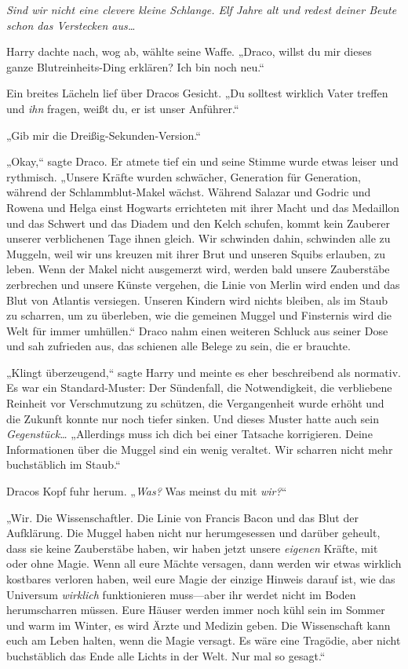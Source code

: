 {\emph{Sind wir nicht eine clevere kleine Schlange. Elf Jahre alt und redest deiner Beute schon das Verstecken aus…}

Harry dachte nach, wog ab, wählte seine Waffe. „Draco, willst du mir dieses ganze Blutreinheits-Ding erklären? Ich bin noch neu.“

Ein breites Lächeln lief über Dracos Gesicht. „Du solltest wirklich Vater treffen und \emph{ihn} fragen, weißt du, er ist unser Anführer.“

„Gib mir die Dreißig-Sekunden-Version.“

„Okay,“ sagte Draco. Er atmete tief ein und seine Stimme wurde etwas leiser und rythmisch. „Unsere Kräfte wurden schwächer, Generation für Generation, während der Schlammblut-Makel wächst. Während Salazar und Godric und Rowena und Helga einst Hogwarts errichteten mit ihrer Macht und das Medaillon und das Schwert und das Diadem und den Kelch schufen, kommt kein Zauberer unserer verblichenen Tage ihnen gleich. Wir schwinden dahin, schwinden alle zu Muggeln, weil wir uns kreuzen mit ihrer Brut und unseren Squibs erlauben, zu leben. Wenn der Makel nicht ausgemerzt wird, werden bald unsere Zauberstäbe zerbrechen und unsere Künste vergehen, die Linie von Merlin wird enden und das Blut von Atlantis versiegen. Unseren Kindern wird nichts bleiben, als im Staub zu scharren, um zu überleben, wie die gemeinen Muggel und Finsternis wird die Welt für immer umhüllen.“ Draco nahm einen weiteren Schluck aus seiner Dose und sah zufrieden aus, das schienen alle Belege zu sein, die er brauchte.

„Klingt überzeugend,“ sagte Harry und meinte es eher beschreibend als normativ. Es war ein Standard-Muster: Der Sündenfall, die Notwendigkeit, die verbliebene Reinheit vor Verschmutzung zu schützen, die Vergangenheit wurde erhöht und die Zukunft konnte nur noch tiefer sinken. Und dieses Muster hatte auch sein \emph{Gegenstück…} „Allerdings muss ich dich bei einer Tatsache korrigieren. Deine Informationen über die Muggel sind ein wenig veraltet. Wir scharren nicht mehr buchstäblich im Staub.“

Dracos Kopf fuhr herum. „\emph{Was?} Was meinst du mit \emph{wir?}“

„Wir. Die Wissenschaftler. Die Linie von Francis Bacon und das Blut der Aufklärung. Die Muggel haben nicht nur herumgesessen und darüber geheult, dass sie keine Zauberstäbe haben, wir haben jetzt unsere \emph{eigenen} Kräfte, mit oder ohne Magie. Wenn all eure Mächte versagen, dann werden wir etwas wirklich kostbares verloren haben, weil eure Magie der einzige Hinweis darauf ist, wie das Universum \emph{wirklich} funktionieren muss—aber ihr werdet nicht im Boden herumscharren müssen. Eure Häuser werden immer noch kühl sein im Sommer und warm im Winter, es wird Ärzte und Medizin geben. Die Wissenschaft kann euch am Leben halten, wenn die Magie versagt. Es wäre eine Tragödie, aber nicht buchstäblich das Ende alle Lichts in der Welt. Nur mal so gesagt.“

}
